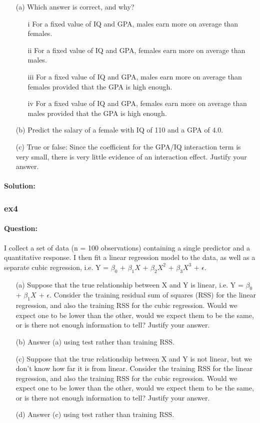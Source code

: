 \documentclass[a4paper,12pt,titlepage]{article} %
\begin{document}
\begin{itemize}
	\item[(a)] Which answer is correct, and why?
	\begin{itemize}
		\item[i] For a fixed value of IQ and GPA, males earn more on average than females.
		\item[ii] For a fixed value of IQ and GPA, females earn more on average than males.
		\item[iii] For a fixed value of IQ and GPA, males earn more on average than females provided that the GPA is high enough.
		\item[iv] For a fixed value of IQ and GPA, females earn more on average than males provided that the GPA is high enough.
	\end{itemize}
	\item[(b)] Predict the salary of a female with IQ of 110 and a GPA of 4.0.
	\item[(c)] True or false: Since the coefficient for the GPA/IQ interaction term is very small, there is very little evidence of an interaction effect. Justify your answer.
\end{itemize}

\paragraph{Solution:}

\subsubsection{ex4}
\paragraph{Question:} I collect a set of data (n = 100 observations) containing a single
predictor and a quantitative response. I then fit a linear regression model to the data, as well as a separate cubic regression, i.e. Y = $\beta_{0}$ + $\beta_{1} X$ + $\beta_{2} X^{2}$ + $\beta_{3} X^{3}$ + $\epsilon$.

\begin{itemize}
	\item[(a)] Suppose that the true relationship between X and Y is linear, i.e. Y = $\beta_{0}$ + $\beta_{1} X^{}$ + $\epsilon$. Consider the training residual sum of squares (RSS) for the linear regression, and also the training RSS for the cubic regression. Would we expect one to be lower than the other, would we expect them to be the same, or is there not enough information to tell? Justify your answer.
	\item[(b)] Answer (a) using test rather than training RSS.
	\item[(c)] Suppose that the true relationship between X and Y is not linear, but we don't know how far it is from linear. Consider the training RSS for the linear regression, and also the training RSS for the cubic regression. Would we expect one to be lower than the
	other, would we expect them to be the same, or is there not enough information to tell? Justify your answer.
	\item[(d)] Answer (c) using test rather than training RSS.
\end{itemize}
\end{document}

